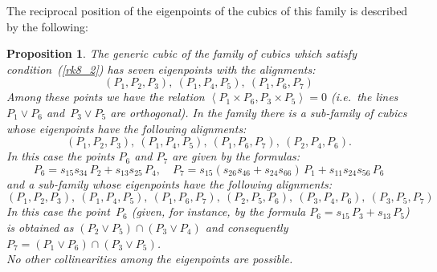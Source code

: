 \documentclass{amsart}
\theoremstyle{plain}
\newtheorem{prop}[lemma]{Proposition}
\theoremstyle{definition}
\newcommand{\scl}[2]{\left\langle {#1}, {#2} \right\rangle}
\begin{document}
The reciprocal position of the eigenpoints of the cubics of this family
is described by the following:
%
\begin{prop}
\label{prop:rk8_2B}
The generic cubic of the family of cubics which satisfy condition~(\ref{rk8_2})
has seven eigenpoints with the alignments:
%
\[
  (P_1, P_2, P_3), \ (P_1, P_4, P_5), \ (P_1, P_6, P_7)
\]
%
Among these points we have the relation
$\scl{P_1 \times P_6}{P_3\times P_5}=0$
(i.e.\ the lines~$P_1 \vee P_6$ and~$P_3 \vee P_5$ are orthogonal).
In the family there is a sub-family of cubics whose eigenpoints have the following alignments:
%
\[
  (P_1, P_2, P_3),\ (P_1, P_4, P_5),\ (P_1, P_6, P_7),\ (P_2, P_4, P_6).
\]
%
In this case the points $P_6$ and $P_7$ are given by the formulas:
%
\begin{equation}
\label{formuleP6_P7}
P_6 =  s_{15}s_{34}\, P_2 + s_{13}s_{25}\, P_4, \quad 
P_7 = s_{15}(s_{26}s_{46}+s_{24}s_{66})\, P_1+ s_{11}s_{24}s_{56}\, P_6
\end{equation}
%
and a sub-family whose eigenpoints have the following
alignments:
%
\[
  (P_1, P_2, P_3),\ (P_1, P_4, P_5), \ 
  (P_1, P_6, P_7),\ (P_2, P_5, P_6), \ 
  (P_3, P_4, P_6),\ (P_3, P_5, P_7)
\]
%
In this case the point~$P_6$ (given, for instance, by the formula
$P_6 = s_{15} \, P_3 + s_{13} \, P_5$) is obtained as
$(P_2 \vee P_5) \cap (P_3 \vee P_4)$ and consequently
$P_7 = (P_1 \vee P_6) \cap (P_3 \vee P_5)$.\\
No other collinearities among the eigenpoints are possible.
\end{prop}
%
\end{document}
